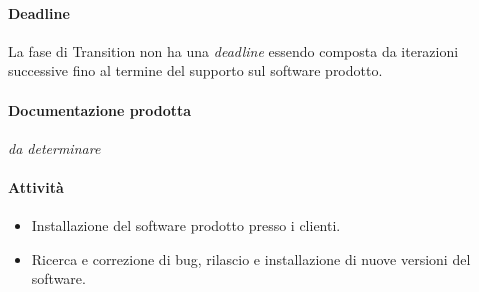 \paragraph{Deadline}
La fase di Transition non ha una \emph{deadline} essendo composta da iterazioni successive fino al termine del supporto sul software prodotto.

\paragraph{Documentazione prodotta}
\emph{da determinare}

\paragraph{Attivit\`a}
\begin{itemize}
	\item Installazione del software prodotto presso i clienti.
	\item Ricerca e correzione di bug, rilascio e installazione di nuove versioni del software.
\end{itemize}
